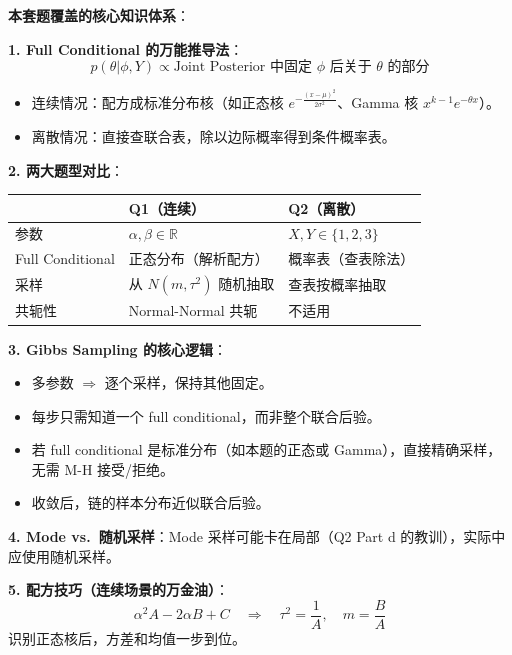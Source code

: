 \documentclass[11pt,a4paper]{article}
\begin{document}
\begin{summarybox}
\textbf{本套题覆盖的核心知识体系}：

\medskip
\textbf{1. Full Conditional 的万能推导法}：
$$\boxed{p(\theta | \phi, Y) \propto \text{Joint Posterior 中固定 $\phi$ 后关于 $\theta$ 的部分}}$$
\begin{itemize}
    \item 连续情况：配方成标准分布核（如正态核 $e^{-\frac{(x-\mu)^2}{2\sigma^2}}$、Gamma 核 $x^{k-1}e^{-\theta x}$）。
    \item 离散情况：直接查联合表，除以边际概率得到条件概率表。
\end{itemize}

\textbf{2. 两大题型对比}：
\begin{center}
\begin{tabular}{l p{5cm} p{5cm}}
\toprule
& \textbf{Q1（连续）} & \textbf{Q2（离散）} \\
\midrule
参数 & $\alpha, \beta \in \mathbb{R}$ & $X, Y \in \{1,2,3\}$ \\
Full Conditional & 正态分布（解析配方） & 概率表（查表除法） \\
采样 & 从 $N(m, \tau^2)$ 随机抽取 & 查表按概率抽取 \\
共轭性 & Normal-Normal 共轭 & 不适用 \\
\bottomrule
\end{tabular}
\end{center}

\textbf{3. Gibbs Sampling 的核心逻辑}：
\begin{itemize}
    \item 多参数 $\Rightarrow$ 逐个采样，保持其他固定。
    \item 每步只需知道一个 full conditional，而非整个联合后验。
    \item 若 full conditional 是标准分布（如本题的正态或 Gamma），直接精确采样，无需 M-H 接受/拒绝。
    \item 收敛后，链的样本分布近似联合后验。
\end{itemize}

\textbf{4. Mode vs.\ 随机采样}：Mode 采样可能卡在局部（Q2 Part d 的教训），实际中应使用随机采样。

\textbf{5. 配方技巧（连续场景的万金油）}：
$$\alpha^2 A - 2\alpha B + C \quad\Rightarrow\quad \tau^2 = \frac{1}{A}, \quad m = \frac{B}{A}$$
识别正态核后，方差和均值一步到位。
\end{summarybox}
\end{document}
